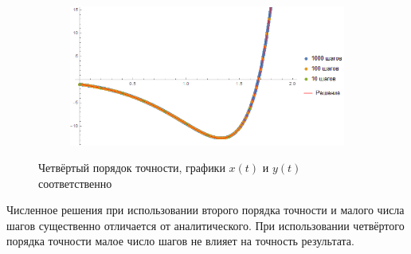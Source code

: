 \documentclass[a4paper,12pt,titlepage,finall]{article}
\begin{document}
\begin{enumerate}
\begin{figure}[h]
\begin{subfigure}{.5\textwidth}
\end{subfigure}%
\begin{subfigure}{.5\textwidth}
  \centering
  \includegraphics[width=\textwidth]{test_1_6_4_y.png}
\end{subfigure}
\caption{Четвёртый порядок точности, графики $x(t)$ и $y(t)$ соответственно}
\end{figure}
\par
Численное решения при использовании второго порядка точности и малого числа шагов существенно отличается от аналитического. При использовании четвёртого порядка точности малое число шагов не влияет на точность результата.


\end{enumerate}
\end{document}
